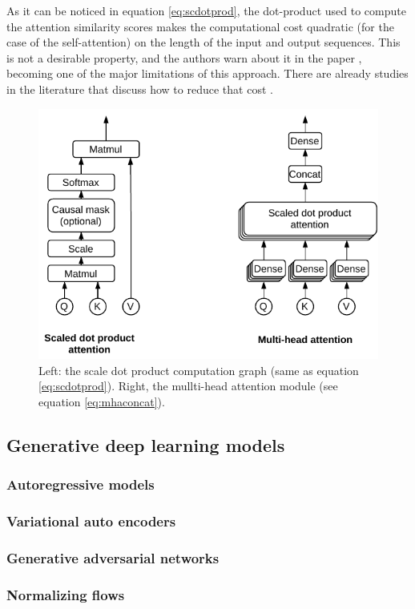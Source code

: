 As it can be noticed in equation \ref{eq:scdotprod}, the dot-product used to compute the attention similarity scores makes the computational cost quadratic (for the case of the self-attention) on the length of the input and output sequences. This is not a desirable property, and the authors warn about it in the paper \cite{vaswani2017}, becoming one of the major limitations of this approach. There are already studies in the literature that discuss how to reduce that cost \cite{jaegle2021, so2021}.

\begin{figure}
	\centering
	\includegraphics[width=0.85\linewidth]{chapter2/images/attention_modules}
	\caption{Left: the scale dot product computation graph (same as equation \ref{eq:scdotprod}). Right, the mullti-head attention module (see equation \ref{eq:mhaconcat}).}
	\label{fig:attentionmodules}
\end{figure}

\subsection{Generative deep learning models}
\subsubsection{Autoregressive models}
\subsubsection{Variational auto encoders}
\subsubsection{Generative adversarial networks}
\subsubsection{Normalizing flows}
